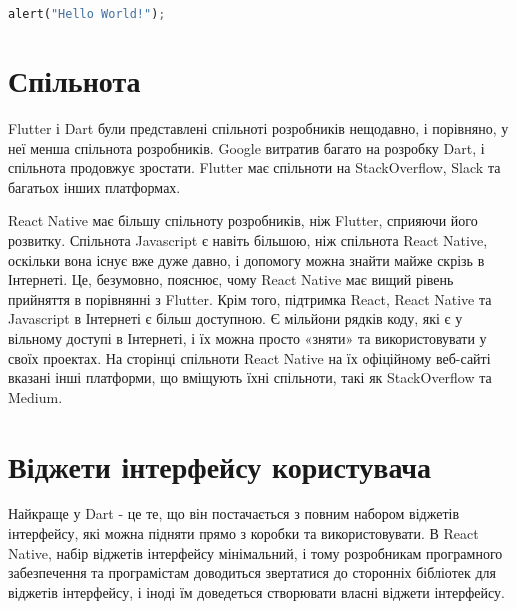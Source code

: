 \begin{lstlisting}[style=light, language=Python,label={lst:vectorimg},caption=Dart Hello World]
  alert("Hello World!");
\end{lstlisting}

\section{Спільнота}\label{section.1.5}

Flutter і Dart були представлені спільноті розробників нещодавно, і порівняно, у неї менша спільнота розробників.
Google витратив багато на розробку Dart, і спільнота продовжує зростати.
Flutter має спільноти на StackOverflow, Slack та багатьох інших платформах.

React Native має більшу спільноту розробників, ніж Flutter, сприяючи його розвитку.
Спільнота Javascript є навіть більшою, ніж спільнота React Native, оскільки вона існує вже дуже давно, і допомогу можна знайти майже скрізь в Інтернеті.
Це, безумовно, пояснює, чому React Native має вищий рівень прийняття в порівнянні з Flutter.
Крім того, підтримка React, React Native та Javascript в Інтернеті є більш доступною.
Є мільйони рядків коду, які є у вільному доступі в Інтернеті, і їх можна просто «зняти» та використовувати у своїх проектах.
На сторінці спільноти React Native на їх офіційному веб-сайті вказані інші платформи, що вміщують їхні спільноти, такі як StackOverflow та Medium.

\section{Віджети інтерфейсу користувача}\label{section.1.6}
Найкраще у Dart - це те, що він постачається з повним набором віджетів інтерфейсу, які можна підняти прямо з коробки та використовувати.
В React Native, набір віджетів інтерфейсу мінімальний, і тому розробникам програмного забезпечення та програмістам доводиться звертатися до сторонніх бібліотек для віджетів інтерфейсу, і іноді їм доведеться створювати власні віджети інтерфейсу. 
